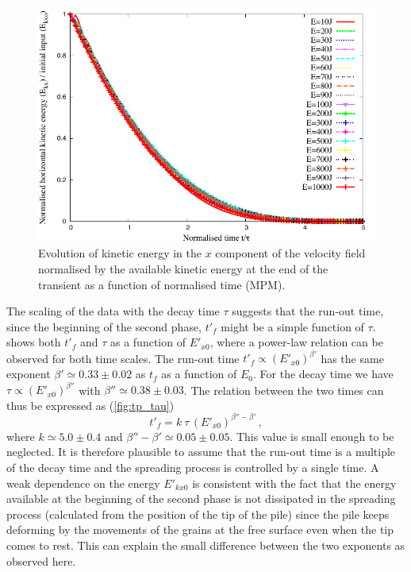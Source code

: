 \documentclass[3p,times,procedia,number]{elsarticle}
\begin{document}
\begin{figure}[tbhp]
  \centering
  \includegraphics[width=\textwidth]{figs/EkxKoTTau_Slope}
  \caption[Evolution of the normalised horizontal kinetic energy as function of 
  the normalised time since the transient phase.]{Evolution of kinetic energy in 
  the $x$ component of 
  the velocity field  normalised by the available kinetic energy at the end of 
  the transient as a function of normalised time (MPM).}
  \label{fig:ExEx0_vs_ttau}
\end{figure}


The scaling of the data with the decay time $\tau$ suggests that the 
run-out time, since the beginning of the second phase, $t'_f$ might be a simple 
function of $\tau$.~ shows both $t'_f$ and $\tau$ as 
a function of $E'_{x0}$, where a power-law relation can be observed for both 
time scales. The run-out time $t'_f \propto (E'_{x0})^{\beta'}$ has the 
same exponent $\beta' \simeq 0.33 \pm 0.02$ as $t_f$ as a function of $E_0$. 
For the decay time we have $\tau \propto (E'_{x0})^{\beta''}$ with $\beta'' 
\simeq 0.38 \pm 0.03$. The relation between the two times can thus be expressed 
as (\cref{fig:tp_tau})
\begin{equation}
  t'_f = k  \ \tau \, (E'_{x0})^{\beta'' - \beta'} \,,
  \label{eqn:t'f}
\end{equation}
where $k \simeq 5.0 \pm 0.4$ and $\beta'' - \beta' \simeq 0.05 \pm 0.05$. This 
value is small enough to be neglected. It is therefore plausible to assume that 
the run-out time is a multiple of the decay time and the spreading process is 
controlled by a single time. A weak dependence on the energy $E'_{kx0}$ is 
consistent with the fact that the energy available at the beginning of the 
second phase is not dissipated in the spreading process (calculated from the 
position of the tip of the pile) since the pile keeps deforming by the 
movements of the grains at the free surface even when the tip comes to rest. 
This can explain the small difference between the two exponents as observed 
here.
\end{document}
